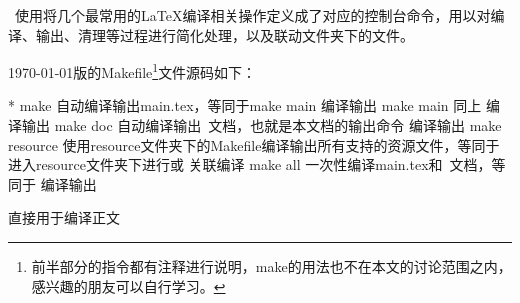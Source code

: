 \dk~使用将几个最常用的{\LaTeX}编译相关操作定义成了对应的控制台命令，用以对编译、输出、清理等过程进行简化处理，以及联动文件夹下的文件。

{\today}版的Makefile\footnote{前半部分的指令都有注释进行说明，make的用法也不在本文的讨论范围之内，感兴趣的朋友可以自行学习。}文件源码如下：


\begin{cvhonors}*
  \cvhonor
  {make}
  {自动编译输出main.tex，等同于make main}
  {编译输出}
  \cvhonor
  {make main}
  {同上}
  {编译输出}
  \cvhonor
  {make doc}
  {自动编译输出\dk~文档，也就是本文档的输出命令}
  {编译输出}
  \cvhonor
  {make resource}
  {使用resource文件夹下的Makefile编译输出所有支持的资源文件，等同于进入resource文件夹下进行或}
  {关联编译}
  \cvhonor
  {make all}
  {一次性编译main.tex和\dk~文档，等同于}
  {编译输出}
\end{cvhonors}

直接用于编译正文

\clearpage
